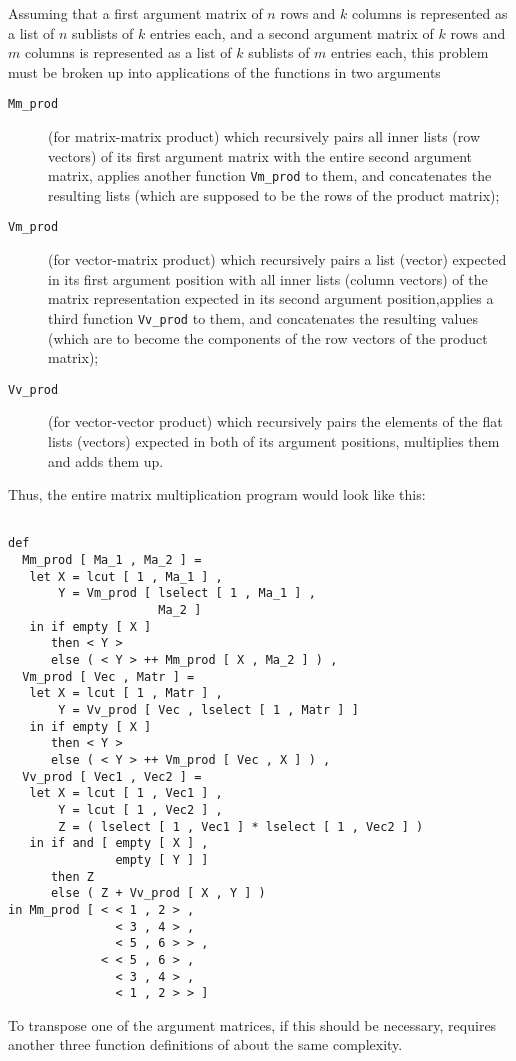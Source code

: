 Assuming that a first argument matrix of $n$ rows and $k$ columns 
is represented as a list of $n$ sublists of $k$ entries each, and
a second argument matrix of $k$ rows and $m$ columns is
 represented as a list of $k$ sublists of $m$ entries each, this problem must be
broken up into applications of the functions in two arguments
\begin{description}
\item[{\tt Mm\_prod}] (for {\mys matrix-matrix product}) which 
recursively pairs all inner lists (row vectors) of its first
argument matrix with the entire second argument matrix,
applies another function {\tt Vm\_prod} to them, and concatenates the resulting lists (which are supposed to be the rows of the
product matrix);
\item[{\tt Vm\_prod}] (for {\mys vector-matrix product}) which
recursively pairs a list (vector) expected in its first
argument position with all inner lists (column vectors) of
the matrix representation expected in its second argument position,applies a third function {\tt Vv\_prod} to them, and concatenates the
resulting values (which are to become the components of the row
vectors of the product matrix);
\item [{\tt Vv\_prod}] (for {\mys vector-vector product}) which recursively pairs
the elements of the flat lists (vectors) expected in both of its
argument positions, multiplies them and adds them up.
\end{description}
Thus, the entire matrix multiplication program would look 
like this:
\begin{verbatim}

def 
  Mm_prod [ Ma_1 , Ma_2 ] =
   let X = lcut [ 1 , Ma_1 ] ,
       Y = Vm_prod [ lselect [ 1 , Ma_1 ] ,
                     Ma_2 ]
   in if empty [ X ]
      then < Y >
      else ( < Y > ++ Mm_prod [ X , Ma_2 ] ) ,
  Vm_prod [ Vec , Matr ] =
   let X = lcut [ 1 , Matr ] ,
       Y = Vv_prod [ Vec , lselect [ 1 , Matr ] ]
   in if empty [ X ]
      then < Y >
      else ( < Y > ++ Vm_prod [ Vec , X ] ) ,
  Vv_prod [ Vec1 , Vec2 ] =
   let X = lcut [ 1 , Vec1 ] ,
       Y = lcut [ 1 , Vec2 ] ,
       Z = ( lselect [ 1 , Vec1 ] * lselect [ 1 , Vec2 ] )
   in if and [ empty [ X ] ,
               empty [ Y ] ]
      then Z
      else ( Z + Vv_prod [ X , Y ] )
in Mm_prod [ < < 1 , 2 > ,
               < 3 , 4 > ,
               < 5 , 6 > > ,
             < < 5 , 6 > ,
               < 3 , 4 > ,
               < 1 , 2 > > ]

\end{verbatim}
To transpose one of the argument matrices, if this should be necessary, requires another three function definitions of about the same
complexity.

